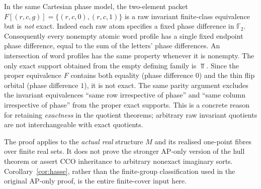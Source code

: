 \begin{remark}
\label{rem:phase-thin-not-exact}
In the same Cartesian phase model, the two-element packet
$F[(r,c,g)]=\{(r,c,0),(r,c,1)\}$ is a raw invariant
finite-class equivalence but is \emph{not} exact.  Indeed each
raw atom specifies a fixed phase difference in $\mathbb F_2$.
Consequently every nonempty atomic word profile has a single
fixed endpoint phase difference, equal to the sum of the
letters' phase differences.  An intersection of word profiles
has the same property whenever it is nonempty.  The only exact
support obtained from the empty defining family is $\Top$.
Since the proper equivalence $F$ contains both equality
(phase difference $0$) and the thin flip orbital (phase
difference $1$), it is not exact.  The same parity argument
excludes the invariant equivalences ``same row irrespective of
phase'' and ``same column irrespective of phase'' from the
proper exact supports.  This is a concrete reason for retaining
\emph{exactness} in the quotient theorems; arbitrary raw invariant
quotients are not interchangeable with exact quotients.
\end{remark}

\begin{remark}
The proof applies to the \emph{actual real} structure $M$ and its realised
one-point fibres over finite real sets. It does not prove the stronger
AP-only version of the hull theorem or assert CCO inheritance to arbitrary
nonexact imaginary sorts. Corollary~\ref{cor:hasse}, rather than the
finite-group classification used in the original AP-only proof, is the
entire finite-cover input here.
\end{remark}
